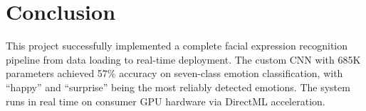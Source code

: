 \documentclass[12pt,a4paper]{article}
\begin{document}
\section{Conclusion}
This project successfully implemented a complete facial expression recognition pipeline from data loading to real-time deployment. The custom CNN with 685K parameters achieved 57\% accuracy on seven-class emotion classification, with ``happy'' and ``surprise'' being the most reliably detected emotions. The system runs in real time on consumer GPU hardware via DirectML acceleration.
\end{document}
